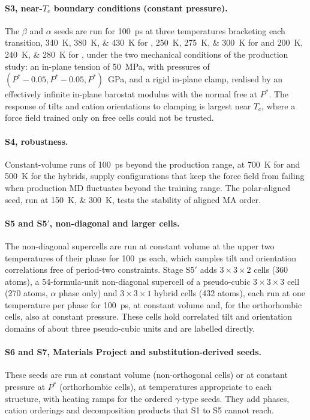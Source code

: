 \paragraph{S3, near-$T_\mathrm{c}$ boundary conditions (constant pressure).} The $\beta$ and $\alpha$
seeds are run for \SI{100}{\pico\second} at three temperatures bracketing each transition,
\SIlist{340;380;430}{\kelvin} for \CsSnI{}, \SIlist{250;275;300}{\kelvin} for \MASnI{} and
\SIlist{200;240;280}{\kelvin} for \FASnI{}, under the two mechanical conditions of the production
study: an in-plane tension of \SI{50}{\mega\pascal}, with pressures of $(P^\ast-0.05, P^\ast-0.05,
P^\ast)$~GPa, and a rigid in-plane clamp, realised by an effectively infinite in-plane barostat
modulus with the normal free at $P^\ast$. The response of tilts and cation orientations to clamping
is largest near $T_\mathrm{c}$, where a force field trained only on free cells could not be trusted.

\paragraph{S4, robustness.} Constant-volume runs of \SI{100}{\pico\second} beyond the production range,
at \SI{700}{\kelvin} for \CsSnI{} and \SI{500}{\kelvin} for the hybrids, supply configurations that
keep the force field from failing when production MD fluctuates beyond the training range. The
polar-aligned \MASnI{} seed, run at \SIlist{150;300}{\kelvin}, tests the stability of aligned MA
order.

\paragraph{S5 and S5$'$, non-diagonal and larger cells.} The non-diagonal supercells are run at
constant volume at the upper two temperatures of their phase for \SI{100}{\pico\second} each, which
samples tilt and orientation correlations free of period-two constraints. Stage S5$'$ adds
$3\times3\times2$ \CsSnI{} cells (360 atoms), a 54-formula-unit non-diagonal supercell of a pseudo-cubic
$3\times3\times3$ cell (270 atoms, $\alpha$ phase only) and $3\times3\times1$ hybrid cells (432 atoms),
each run at one temperature per phase for \SI{100}{\pico\second}, at constant volume and, for the
orthorhombic cells, also at constant pressure. These cells hold correlated tilt and orientation
domains of about three pseudo-cubic units and are labelled directly.

\paragraph{S6 and S7, Materials Project and substitution-derived seeds.} These seeds are run at
constant volume (non-orthogonal cells) or at constant pressure at $P^\ast$ (orthorhombic cells), at
temperatures appropriate to each structure, with heating ramps for the ordered $\gamma$-type seeds.
They add phases, cation orderings and decomposition products that S1 to S5 cannot reach.

